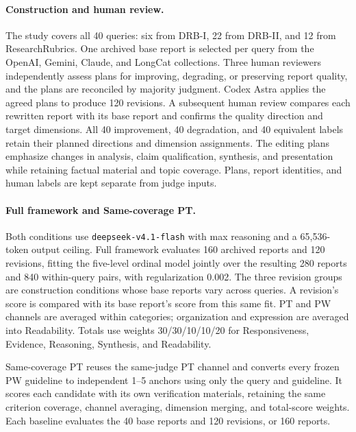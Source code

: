 \documentclass{article}
\begin{document}
\paragraph{Construction and human review.}
The study covers all 40 queries: six from DRB-I, 22 from DRB-II, and 12 from ResearchRubrics. One archived base report is selected per query from the OpenAI, Gemini, Claude, and LongCat collections. Three human reviewers independently assess plans for improving, degrading, or preserving report quality, and the plans are reconciled by majority judgment. Codex Astra applies the agreed plans to produce 120 revisions. A subsequent human review compares each rewritten report with its base report and confirms the quality direction and target dimensions. All 40 improvement, 40 degradation, and 40 equivalent labels retain their planned directions and dimension assignments. The editing plans emphasize changes in analysis, claim qualification, synthesis, and presentation while retaining factual material and topic coverage. Plans, report identities, and human labels are kept separate from judge inputs.

\paragraph{Full framework and Same-coverage PT.}
Both conditions use \texttt{deepseek-v4.1-flash} with max reasoning and a 65,536-token output ceiling. Full framework evaluates 160 archived reports and 120 revisions, fitting the five-level ordinal model jointly over the resulting 280 reports and 840 within-query pairs, with regularization 0.002. The three revision groups are construction conditions whose base reports vary across queries. A revision's score is compared with its base report's score from this same fit. PT and PW channels are averaged within categories; organization and expression are averaged into Readability. Totals use weights 30/30/10/10/20 for Responsiveness, Evidence, Reasoning, Synthesis, and Readability.

Same-coverage PT reuses the same-judge PT channel and converts every frozen PW guideline to independent 1--5 anchors using only the query and guideline. It scores each candidate with its own verification materials, retaining the same criterion coverage, channel averaging, dimension merging, and total-score weights. Each baseline evaluates the 40 base reports and 120 revisions, or 160 reports.
\end{document}
